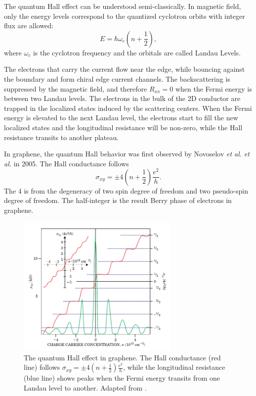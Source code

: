 \documentclass[pdflatex, sectionletters, 12pt]{pittetd}    %
\begin{document}
The quantum Hall effect can be understood semi-classically. In magnetic field, only the energy levels correspond to the quantized cyclotron orbits with integer flux are allowed:
$$E = \hbar\omega_c \left(n + \frac{1}{2}\right),$$
where $\omega_c$ is the cyclotron frequency and the orbitals are called Landau Levels.

The electrons that carry the current flow near the edge, while bouncing against the boundary and form chiral edge current channels. The backscattering is suppressed by the magnetic field, and therefore $R_{xx} = 0$ when the Fermi energy is between two Landau levels. The electrons in the bulk of the 2D conductor are trapped in the localized states induced by the scattering centers. When the Fermi energy is elevated to the next Landau level, the electrons start to fill the new localized states and the longitudinal resistance will be non-zero, while the Hall resistance transits to another plateau.

In graphene, the quantum Hall behavior was first observed by Novoselov \textit{et al.} \cite{novoselov2005two} \textit{et al.}\cite{zhang2005experimental} in 2005. The Hall conductance follows
$$
\sigma_{xy} = \pm 4\left(n + \frac{1}{2}\right)\frac{e^2}{h}.
$$
The 4 is from the degeneracy of two spin degree of freedom and two pseudo-spin degree of freedom. The half-integer is the result Berry phase of electrons\cite{zhang2005experimental} in graphene.

\begin{figure}[p]
	\centering
	\includegraphics[width=0.7\textwidth]{Drawing/GrapheneQuantumHall.pdf}
	\caption{The quantum Hall effect in graphene. The Hall conductance (red line) follows $\displaystyle \sigma_{xy} = \pm4\left(n + \frac{1}{2}\right)\frac{e^2}{h}$, while the longitudinal resistance (blue line) shows peaks when the Fermi energy transits from one Landau level to another. Adapted from \cite{novoselov2005two}.}
	\label{FIG:GrapheneQuantumHall}
\end{figure}
\end{document}
